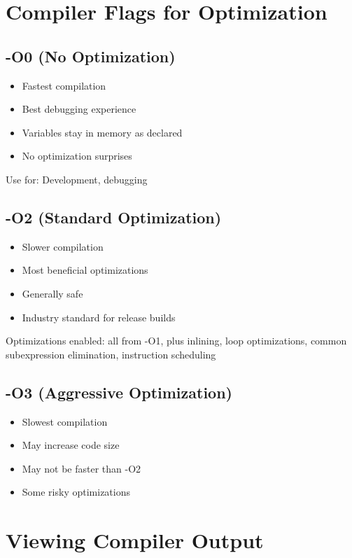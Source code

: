 \section{Compiler Flags for Optimization}

\subsection{-O0 (No Optimization)}

\begin{itemize}
    \item Fastest compilation
    \item Best debugging experience
    \item Variables stay in memory as declared
    \item No optimization surprises
\end{itemize}

Use for: Development, debugging

\subsection{-O2 (Standard Optimization)}

\begin{itemize}
    \item Slower compilation
    \item Most beneficial optimizations
    \item Generally safe
    \item Industry standard for release builds
\end{itemize}

Optimizations enabled: all from -O1, plus inlining, loop optimizations, common subexpression elimination, instruction scheduling

\subsection{-O3 (Aggressive Optimization)}

\begin{itemize}
    \item Slowest compilation
    \item May increase code size
    \item May not be faster than -O2
    \item Some risky optimizations
\end{itemize}

\section{Viewing Compiler Output}


